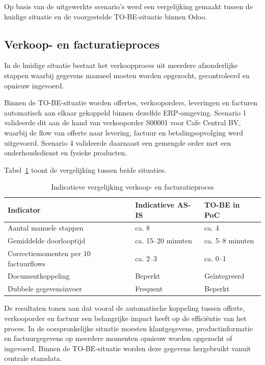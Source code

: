 Op basis van de uitgewerkte scenario's werd een vergelijking gemaakt tussen de huidige situatie en de voorgestelde TO-BE-situatie binnen Odoo.

\subsection{Verkoop- en facturatieproces}

In de huidige situatie bestaat het verkoopproces uit meerdere afzonderlijke stappen waarbij gegevens manueel moeten worden opgezocht, gecontroleerd en opnieuw ingevoerd.

Binnen de TO-BE-situatie worden offertes, verkooporders, leveringen en facturen automatisch aan elkaar gekoppeld binnen dezelfde ERP-omgeving. Scenario 1 valideerde dit aan de hand van verkooporder S00001 voor Cafe Central BV, waarbij de flow van offerte naar levering, factuur en betalingsopvolging werd uitgevoerd. Scenario 4 valideerde daarnaast een gemengde order met een onderhoudsdienst en fysieke producten.

Tabel~\ref{tab:salesvergelijking} toont de vergelijking tussen beide situaties.

\begin{table}[H]
\centering
\caption{Indicatieve vergelijking verkoop- en facturatieproces}
\label{tab:salesvergelijking}
\begin{tabular}{|p{5cm}|p{3cm}|p{3cm}|}
\hline
\textbf{Indicator} & \textbf{Indicatieve AS-IS} & \textbf{TO-BE in PoC} \\
\hline
Aantal manuele stappen & ca. 8 & ca. 4 \\
\hline
Gemiddelde doorlooptijd & ca. 15--20 minuten & ca. 5--8 minuten \\
\hline
Correctiemomenten per 10 factuurflows & ca. 2--3 & ca. 0--1 \\
\hline
Documentkoppeling & Beperkt & Geïntegreerd \\
\hline
Dubbele gegevensinvoer & Frequent & Beperkt \\
\hline
\end{tabular}
\end{table}

De resultaten tonen aan dat vooral de automatische koppeling tussen offerte, verkooporder en factuur een belangrijke impact heeft op de efficiëntie van het proces. In de oorspronkelijke situatie moesten klantgegevens, productinformatie en factuurgegevens op meerdere momenten opnieuw worden opgezocht of ingevoerd. Binnen de TO-BE-situatie worden deze gegevens hergebruikt vanuit centrale stamdata.

